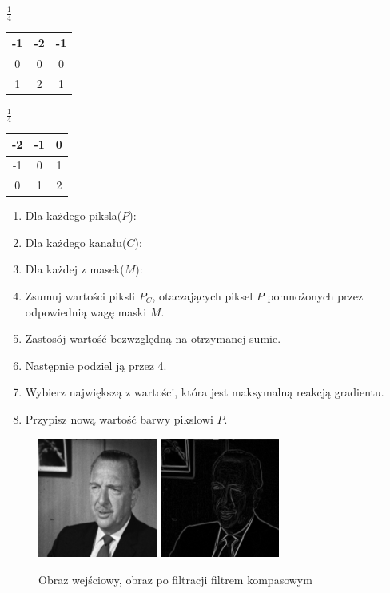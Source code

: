 \documentclass[final,a4paper,openany,12pt]{mwbk}
\begin{document}
\begin{center}
	$\frac{1}{4}$
	\begin{tabular}{|c|c|c|}
		\hline
		-1 & -2 & -1\\
		\hline
		0 & 0 & 0\\
		\hline
		1 & 2 & 1\\
		\hline
	\end{tabular}
\end{center}

\begin{center}
	$\frac{1}{4}$
	\begin{tabular}{|c|c|c|}
		\hline
		-2 & -1 & 0\\
		\hline
		-1 & 0 & 1\\
		\hline
		0 & 1 & 2\\
		\hline
	\end{tabular}
\end{center}

\begin{enumerate}
	\item Dla każdego piksla($P$):
	\item Dla każdego kanału($C$):
	\item Dla każdej z masek($M$):
	\item Zsumuj wartości piksli $P_C$, otaczających piksel $P$ pomnożonych przez odpowiednią wagę maski $M$.
	\item Zastosój wartość bezwzględną na otrzymanej sumie.
	\item Następnie podziel ją przez 4.
	\item Wybierz największą z wartości, która jest maksymalną reakcją gradientu.
	\item Przypisz nową wartość barwy pikslowi $P$.
\end{enumerate}

\begin{figure}[H]
	\begin{center}
		\includegraphics[width=0.35\textwidth]{gentelman_gray}
		\includegraphics[width=0.35\textwidth]{gentelman_gray_compassSobol_result}
	\end{center}
	\caption{Obraz wejściowy, obraz po filtracji filtrem kompasowym}
\end{figure}
\end{document}
